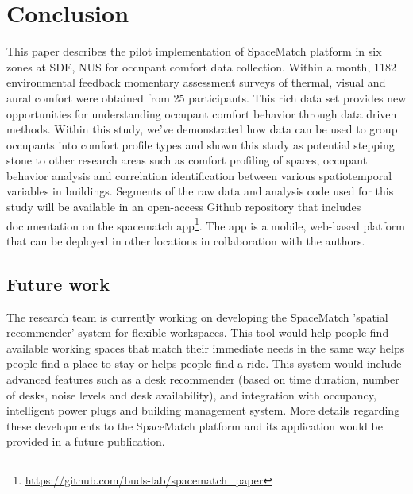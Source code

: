 \documentclass[]{interact}
\theoremstyle{plain}%
\theoremstyle{definition}
\theoremstyle{remark}
\begin{document}
\section{Conclusion}
This paper describes the pilot implementation of SpaceMatch platform in six zones at SDE, NUS for occupant comfort data collection. Within a month, 1182 environmental feedback momentary assessment surveys of thermal, visual and aural comfort were obtained from 25 participants. This rich data set provides new opportunities for understanding occupant comfort behavior through data driven methods. Within this study, we've demonstrated how data can be used to group occupants into comfort profile types and shown this study as potential stepping stone to other research areas such as comfort profiling of spaces, occupant behavior analysis and correlation identification between various spatiotemporal variables in buildings. 
Segments of the raw data and analysis code used for this study will be available in an open-access Github repository that includes documentation on the spacematch app\footnote{\url{https://github.com/buds-lab/spacematch_paper}}. The app is a mobile, web-based platform that can be deployed in other locations in collaboration with the authors.

\subsection{Future work}
The research team is currently working on developing the SpaceMatch 'spatial recommender' system for flexible workspaces. This tool would help people find available working spaces that match their immediate needs in the same way  helps people find a place to stay or  helps people find a ride. This system would include advanced features such as a desk recommender (based on time duration, number of desks, noise levels and desk availability), and integration with occupancy, intelligent power plugs and building management system. More details regarding these developments to the SpaceMatch platform and its application would be provided in a future publication. 



\end{document}
